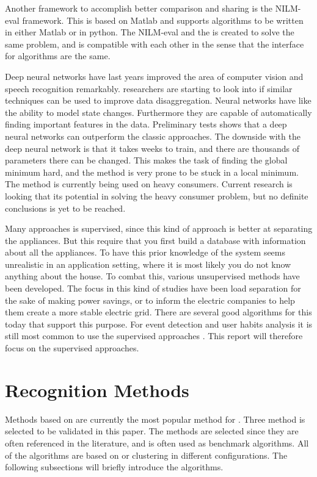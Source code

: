 Another framework to accomplish better comparison and sharing is the NILM-eval framework. This is based on Matlab and supports algorithms to be written in either Matlab or in python. The NILM-eval and the  is created to solve the same problem, and is compatible with each other in the sense that the interface for algorithms are the same\citep{RefWorks:26}. 

Deep neural networks have last years improved the area of computer vision and speech recognition remarkably.  researchers are starting to look into if similar techniques can be used to improve data disaggregation. Neural networks have like  the ability to model state changes. Furthermore they are capable of automatically finding important features in the data. Preliminary tests shows that a deep neural networks can outperform the classic  approaches. The downside with the deep neural network is that it takes weeks to train, and there are thousands of parameters there can be changed. This makes the task of finding the global minimum hard, and the method is very prone to be stuck in a local minimum. The method is currently being used on heavy consumers\citep{RefWorks:25}. Current research is looking that its potential in solving the heavy consumer problem, but no definite conclusions is yet to be reached. 

Many approaches is supervised, since this kind of approach is better at separating the appliances. But this require that you first build a database with information about all the appliances. To have this prior knowledge of the system seems unrealistic in an application setting, where it is most likely you do not know anything about the house. To combat this, various unsupervised methods have been developed. The focus in this kind of studies have been load separation for the sake of making power savings, or to inform the electric companies to help them create a more stable electric grid. There are several good algorithms for this today that support this purpose. For event detection and user habits analysis it is still most common to use the supervised approaches \citep{RefWorks:19}. This report will therefore focus on the supervised approaches. 

\newpage
			

\section{Recognition Methods}
\label{RecognitionMethods}
Methods based on  are currently the most popular method for . Three method is selected to be validated in this paper. The methods are selected since they are often referenced in the literature, and is often used as benchmark algorithms. All of the algorithms are based on  or clustering in different configurations. The following subsections will briefly introduce the algorithms. 


